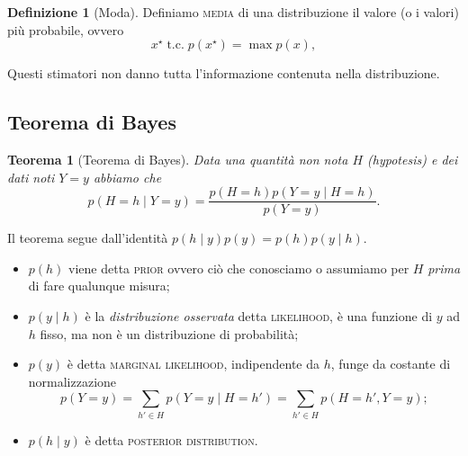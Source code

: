 \documentclass[10pt]{article}
\newcommand{\im}[1]{\textsc{#1}}
\newcommand{\cond}{\mid}
\newcommand{\pare}[1]{
	\ensuremath{\left(#1\right)}
}
\newtheorem{theorem}{Teorema}[section]
\theoremstyle{definition}
\newtheorem{definition}{Definizione}[section]
\begin{document}
\begin{definition}[Moda]
Definiamo \im{media} di una distribuzione il valore (o i valori) più probabile, ovvero
\begin{equation}
x^\star \;\text{t.c.}\; p\pare{x^\star} = \max p\pare{x},
\end{equation}
\end{definition}

Questi stimatori non danno tutta l'informazione contenuta nella distribuzione.

\subsection{Teorema di Bayes}

\begin{theorem}[Teorema di Bayes]\label{teo:bayes}
Data una quantità non nota $H$ (hypotesis) e dei dati noti $Y=y$ abbiamo che
\begin{equation}
p\pare{H=h\cond Y=y} = \frac{p\pare{H=h}p\pare{Y=y\cond H=h}}{p\pare{Y=y}}.
\end{equation}
\end{theorem}
Il teorema segue dall'identità $p\pare{h\cond y} p\pare{y} = p\pare{h} p\pare{y\cond h}$.
\begin{itemize}
\item $p\pare{h}$ viene detta \im{prior} ovvero ciò che conosciamo o assumiamo per $H$ \textit{prima} di fare qualunque misura;
\item $p\pare{y\cond h}$ è la \textit{distribuzione osservata} detta \im{likelihood}, è una funzione di $y$ ad $h$ fisso, ma non è un distribuzione di probabilità;
\item $p\pare{y}$ è detta \im{marginal likelihood}, indipendente da $h$, funge da costante di normalizzazione \[
p\pare{Y=y} = \sum_{h'\in H}p\pare{Y=y \cond H=h'} = \sum_{h'\in H}p\pare{H=h', Y=y};
\]
\item $p\pare{h\cond y}$ è detta \im{posterior distribution}.
\end{itemize}
\end{document}
